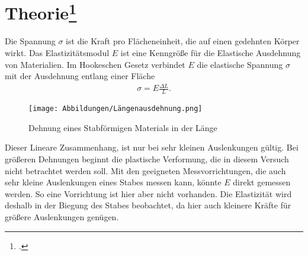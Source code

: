 \section[Theorie]{Theorie\footcite{man:v103}}
Die Spannung $\sigma$ ist die Kraft pro Flächeneinheit, die auf einen gedehnten Körper wirkt.
Das Elastizitätsmodul $E$ ist eine Kenngröße für die Elastische Ausdehnung von Materialien. %
Im Hookeschen Gesetz verbindet $E$ die elastische Spannung $\sigma$ mit der Ausdehnung entlang einer Fläche
\begin{align}
    \sigma = E \frac{\Delta L}{L}.
    \label{eq:Hook_Gesetz}
\end{align}
\begin{figure}[H]
    \centering
    \texttt{[image: Abbildungen/Längenausdehnung.png]}
    \caption{Dehnung eines Stabförmigen Materials in der Länge \cite{man:v103}}
    \label{fig:laengenausdehnung}
\end{figure}
\noindent
Dieser Lineare Zusammenhang, ist nur bei sehr kleinen Auslenkungen gültig.
Bei größeren Dehnungen beginnt die plastische Verformung, die in diesem Versuch nicht betrachtet werden soll.
Mit den geeigneten Messvorrichtungen, die auch sehr kleine Auslenkungen eines Stabes messen kann, 
könnte $E$ direkt gemessen werden.
So eine Vorrichtung ist hier aber nicht vorhanden. 
Die Elastizität wird deshalb in der Biegung des Stabes beobachtet, da hier auch kleinere Kräfte für größere Auslenkungen genügen.

